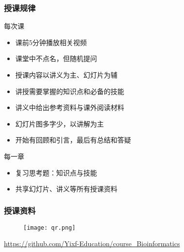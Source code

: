 \begin{frame}
  \frametitle{授课规律}
  \begin{block}{每次课}
    \begin{itemize}
      \item 课前5分钟播放相关视频
      \item 课堂中不点名，但随机提问
      \item 授课内容以讲义为主、幻灯片为辅
      \item 讲授需要掌握的知识点和必备的技能
      \item 讲义中给出参考资料与课外阅读材料
      \item 幻灯片图多字少，以讲解为主
      \item 开始有回顾和引言，最后有总结和答疑
    \end{itemize}
  \end{block}
  \pause
  \begin{block}{每一章}
    \begin{itemize}
      \item 复习思考题：知识点与技能
      \item 共享幻灯片、讲义等所有授课资料
    \end{itemize}
  \end{block}
\end{frame}

\begin{frame}
  \frametitle{授课资料}
  \begin{figure}
    \centering
    \texttt{[image: qr.png]}
  \end{figure}
  \begin{center}
    \href{https://github.com/Yixf-Education/course_Statistics_Story}{https://github.com/Yixf-Education/course\_Bioinformatics}
  \end{center}
\end{frame}

%

